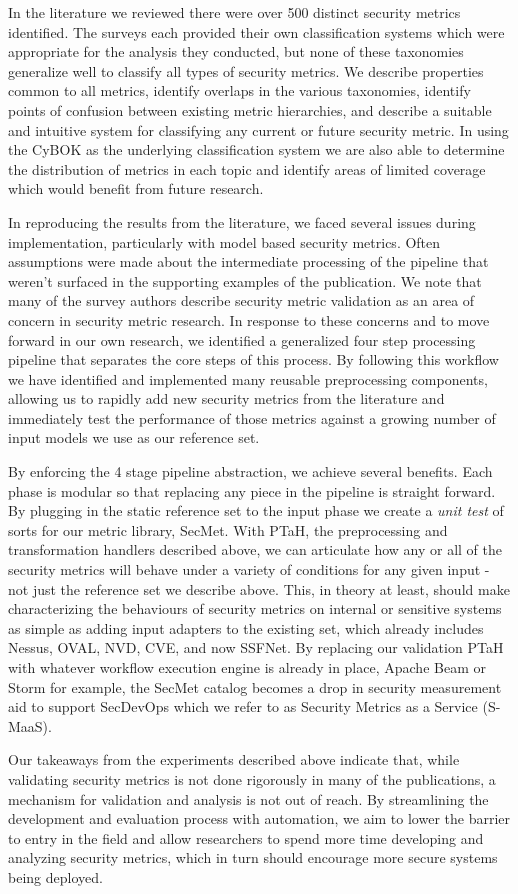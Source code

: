 

In the literature we reviewed there were over 500 distinct security metrics identified. The surveys each provided their own classification systems which were appropriate for the analysis they conducted, but none of these taxonomies generalize well to classify all types of security metrics. We describe properties common to all metrics, identify overlaps in the various taxonomies, identify points of confusion between existing metric hierarchies, and describe a suitable and intuitive system for classifying any current or future security metric. In using the CyBOK as the underlying classification system we are also able to determine the distribution of metrics in each topic and identify areas of limited coverage which would benefit from future research. 

In reproducing the results from the literature, we faced several issues during implementation, particularly with model based security metrics. Often assumptions were made about the intermediate processing of the pipeline that weren't surfaced in the supporting examples of the publication. We note that many of the survey authors describe security metric validation as an area of concern in security metric research. In response to these concerns and to move forward in our own research, we identified a generalized four step processing pipeline that separates the core steps of this process. By following this workflow we have identified and implemented many reusable preprocessing components, allowing us to rapidly add new security metrics from the literature and immediately test the performance of those metrics against a growing number of input models we use as our reference set. 

By enforcing the 4 stage pipeline abstraction, we achieve several benefits. Each phase is modular so that replacing any piece in the pipeline is straight forward. By plugging in the static reference set to the input phase we create a \textit{unit test} of sorts for our metric library, SecMet. With PTaH, the preprocessing and transformation handlers described above, we can articulate how any or all of the security metrics will behave under a variety of conditions for any given input - not just the reference set we describe above. This, in theory at least, should make characterizing the behaviours of security metrics on internal or sensitive systems as simple as adding input adapters to the existing set, which already includes Nessus, OVAL, NVD, CVE, and now SSFNet. By replacing our validation PTaH with whatever workflow execution engine is already in place, Apache Beam or Storm for example, the SecMet catalog becomes a drop in security measurement aid to support SecDevOps which we refer to as Security Metrics as a Service (S-MaaS).

Our takeaways from the experiments described above indicate that, while validating security metrics is not done rigorously in many of the publications, a mechanism for validation and analysis is not out of reach. By streamlining the development and evaluation process with automation, we aim to lower the barrier to entry in the field and allow researchers to spend more time developing and analyzing security metrics, which in turn should encourage more secure systems being deployed. 

